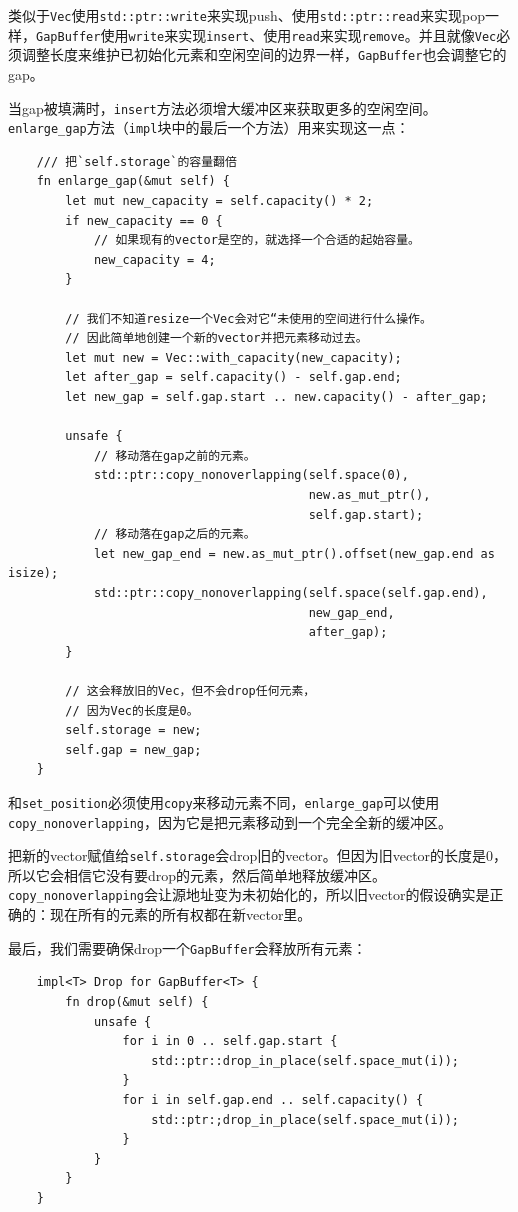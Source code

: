 类似于\texttt{Vec}使用\texttt{std::ptr::write}来实现push、使用\texttt{std::ptr::read}来实现pop一样，\texttt{GapBuffer}使用\texttt{write}来实现\texttt{insert}、使用\texttt{read}来实现\texttt{remove}。并且就像\texttt{Vec}必须调整长度来维护已初始化元素和空闲空间的边界一样，\texttt{GapBuffer}也会调整它的gap。

当gap被填满时，\texttt{insert}方法必须增大缓冲区来获取更多的空闲空间。\texttt{enlarge\_gap}方法（\texttt{impl}块中的最后一个方法）用来实现这一点：
\begin{verbatim}
    /// 把`self.storage`的容量翻倍
    fn enlarge_gap(&mut self) {
        let mut new_capacity = self.capacity() * 2;
        if new_capacity == 0 {
            // 如果现有的vector是空的，就选择一个合适的起始容量。
            new_capacity = 4;
        }

        // 我们不知道resize一个Vec会对它“未使用的空间进行什么操作。
        // 因此简单地创建一个新的vector并把元素移动过去。
        let mut new = Vec::with_capacity(new_capacity);
        let after_gap = self.capacity() - self.gap.end;
        let new_gap = self.gap.start .. new.capacity() - after_gap;

        unsafe {
            // 移动落在gap之前的元素。
            std::ptr::copy_nonoverlapping(self.space(0),
                                          new.as_mut_ptr(),
                                          self.gap.start);
            // 移动落在gap之后的元素。
            let new_gap_end = new.as_mut_ptr().offset(new_gap.end as isize);
            std::ptr::copy_nonoverlapping(self.space(self.gap.end),
                                          new_gap_end,
                                          after_gap);
        }

        // 这会释放旧的Vec，但不会drop任何元素，
        // 因为Vec的长度是0。
        self.storage = new;
        self.gap = new_gap;
    }
\end{verbatim}

和\texttt{set\_position}必须使用\texttt{copy}来移动元素不同，\texttt{enlarge\_gap}可以使用\texttt{copy\_nonoverlapping}，因为它是把元素移动到一个完全全新的缓冲区。

把新的vector赋值给\texttt{self.storage}会drop旧的vector。但因为旧vector的长度是0，所以它会相信它没有要drop的元素，然后简单地释放缓冲区。\texttt{copy\_nonoverlapping}会让源地址变为未初始化的，所以旧vector的假设确实是正确的：现在所有的元素的所有权都在新vector里。

最后，我们需要确保drop一个\texttt{GapBuffer}会释放所有元素：
\begin{verbatim}
    impl<T> Drop for GapBuffer<T> {
        fn drop(&mut self) {
            unsafe {
                for i in 0 .. self.gap.start {
                    std::ptr::drop_in_place(self.space_mut(i));
                }
                for i in self.gap.end .. self.capacity() {
                    std::ptr:;drop_in_place(self.space_mut(i));
                }
            }
        }
    }
\end{verbatim}

